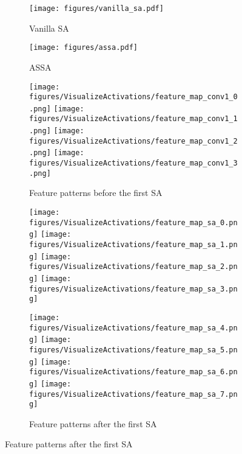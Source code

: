 \documentclass{article}
\begin{document}
\begin{figure}[!ht]
\begin{minipage}[t][67mm][t]{0.51\textwidth}
    \begin{subfigure}{1in}
        \texttt{[image: figures/vanilla\_sa.pdf]}
        \caption{Vanilla SA}
        \label{fig:vanilla_sa}
    \end{subfigure}\begin{subfigure}{1in}
    \texttt{[image: figures/assa.pdf]}
    \caption{ASSA}
    \label{fig:ASSA}
\end{subfigure}
\end{minipage}\begin{minipage}[t][0mm][t]{.49\textwidth}
\vspace{-3cm}
\begin{minipage}[t][10mm][t]{1.0\textwidth}
\begin{subfigure}{2.5in}
\centering
        \texttt{[image: figures/VisualizeActivations/feature\_map\_conv1\_0.png]}
        \texttt{[image: figures/VisualizeActivations/feature\_map\_conv1\_1.png]}
        \texttt{[image: figures/VisualizeActivations/feature\_map\_conv1\_2.png]}
        \texttt{[image: figures/VisualizeActivations/feature\_map\_conv1\_3.png]}
\caption{Feature patterns before the first SA}
\label{fig:feature_before_assa}
\end{subfigure}
\end{minipage}

\begin{minipage}[t][35mm][b]{1.0\textwidth}
\begin{subfigure}{2.5in}
        \texttt{[image: figures/VisualizeActivations/feature\_map\_sa\_0.png]}
        \texttt{[image: figures/VisualizeActivations/feature\_map\_sa\_1.png]}
        \texttt{[image: figures/VisualizeActivations/feature\_map\_sa\_2.png]}
        \texttt{[image: figures/VisualizeActivations/feature\_map\_sa\_3.png]}
\label{fig:feature_after_assa}
\end{subfigure}
\begin{subfigure}{2.5in}
        \texttt{[image: figures/VisualizeActivations/feature\_map\_sa\_4.png]}
        \texttt{[image: figures/VisualizeActivations/feature\_map\_sa\_5.png]}
        \texttt{[image: figures/VisualizeActivations/feature\_map\_sa\_6.png]}
        \texttt{[image: figures/VisualizeActivations/feature\_map\_sa\_7.png]}
\caption{Feature patterns after the first SA}
\label{fig:feature_after_assa}
\end{subfigure}
\end{minipage}


\end{minipage}
\end{figure}
\end{document}

